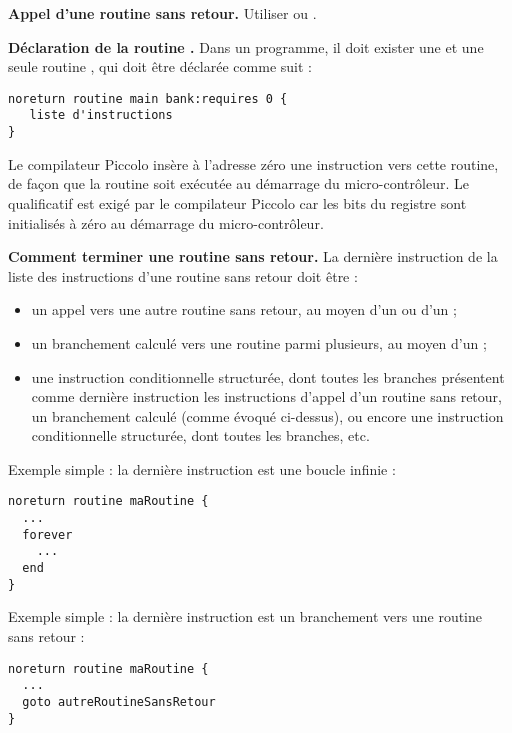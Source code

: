 \textbf{Appel d’une routine sans retour.} Utiliser  ou .


\textbf{Déclaration de la routine .} Dans un programme, il doit exister une et une seule routine , qui doit être déclarée comme suit :

\begin{lstlisting}[language=piccolo]
noreturn routine main bank:requires 0 {
   liste d'instructions
}

\end{lstlisting}

Le compilateur Piccolo insère à l’adresse zéro une instruction  vers cette routine, de façon que la routine  soit exécutée au démarrage du micro-contrôleur. Le qualificatif  est exigé par le compilateur Piccolo car les bits  du registre  sont initialisés à zéro au démarrage du micro-contrôleur.


\textbf{Comment terminer une routine sans retour.} La dernière instruction de la liste des instructions d’une routine sans retour doit être :
\begin{itemize}
  \item un appel vers une autre routine sans retour, au moyen d’un  ou d'un  ;
  \item un branchement calculé vers une routine parmi plusieurs, au moyen d’un  ;
  \item une instruction conditionnelle structurée, dont toutes les branches présentent comme dernière instruction les instructions d’appel d’un routine sans retour, un branchement calculé (comme évoqué ci-dessus), ou encore une instruction conditionnelle structurée, dont toutes les branches, etc.

\end{itemize}

Exemple simple : la dernière instruction est une boucle infinie :
\begin{lstlisting}[language=piccolo]
noreturn routine maRoutine {
  ...
  forever
    ...
  end
}
\end{lstlisting}

Exemple simple : la dernière instruction est un branchement vers une routine sans retour :
\begin{lstlisting}[language=piccolo]
noreturn routine maRoutine {
  ...
  goto autreRoutineSansRetour
}
\end{lstlisting}

